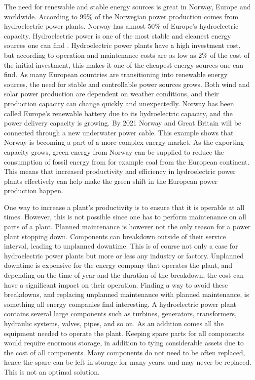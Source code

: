 The need for renewable and stable energy sources is great in Norway, Europe and worldwide. According to \cite{Statkraft2009} $99\%$ of the Norwegian power production comes from hydroelectric power plants. Norway has almost $50\%$ of Europe's hydroelectric capacity. Hydroelectric power is one of the most stable and cleanest energy sources one can find \cite{Statkraft2009}. Hydroelectric power plants have a high investment cost, but according to \cite{Selak2014} operation and maintenance costs are as low as 2\% of the cost of the initial investment, this makes it one of the cheapest energy sources one can find. As many European countries are transitioning into renewable energy sources, the need for stable and controllable power sources grows. Both wind and solar power production are dependent on weather conditions, and their production capacity can change quickly and unexpectedly. Norway has been called Europe's renewable battery due to its hydroelectric capacity, and the power delivery capacity is growing. By 2021 Norway and Great Britain will be connected through a new underwater power cable. This example shows that Norway is becoming a part of a more complex energy market. As the exporting capacity grows, green energy from Norway can be supplied to reduce the consumption of fossil energy from for example coal from the European continent. This means that increased productivity and efficiency in hydroelectric power plants effectively can help make the green shift in the European power production happen. 

One way to increase a plant's productivity is to ensure that it is operable at all times. However, this is not possible since one has to perform maintenance on all parts of a plant. Planned maintenance is however not the only reason for a power plant stopping down. Components can breakdown outside of their service interval, leading to unplanned downtime. This is of course not only a case for hydroelectric power plants but more or less any industry or factory. Unplanned downtime is expensive for the energy company that operates the plant, and depending on the time of year and the duration of the breakdown, the cost can have a significant impact on their operation. Finding a way to avoid these breakdowns, and replacing unplanned maintenance with planned maintenance, is something all energy companies find interesting. A hydroelectric power plant contains several large components such as turbines, generators, transformers, hydraulic systems, valves, pipes, and so on.  As an addition comes all the equipment needed to operate the plant. Keeping spare parts for all components would require enormous storage, in addition to tying considerable assets due to the cost of all components. Many components do not need to be often replaced, hence the spare can be left in storage for many years, and may never be replaced. This is not an optimal solution. 

